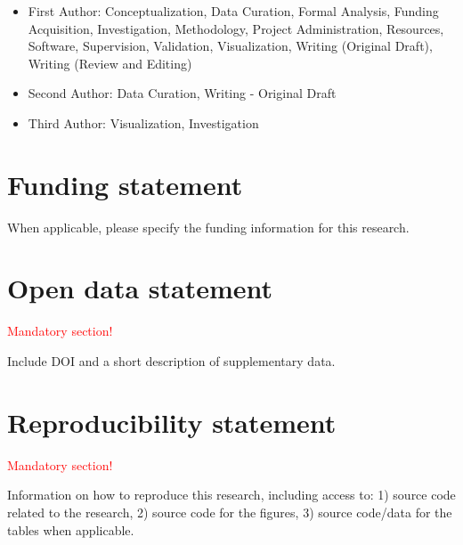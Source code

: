 \begin{itemize}
  \item First Author: Conceptualization, Data Curation, Formal Analysis, Funding Acquisition, Investigation, Methodology, Project Administration, Resources, Software, Supervision, Validation, Visualization, Writing (Original Draft), Writing (Review and Editing)
  \item Second Author: Data Curation, Writing - Original Draft
  \item Third Author: Visualization, Investigation
\end{itemize}


\section*{Funding statement}
When applicable, please specify the funding information for this research.


\section*{Open data statement}
\textcolor{red}{Mandatory section!}

Include DOI and a short description of supplementary data.

\section*{Reproducibility statement}
\textcolor{red}{Mandatory section!}

Information on how to reproduce this research, including access to: 1) source code related to the research, 2) source code for the figures, 3) source code/data for the tables when applicable.

\fi